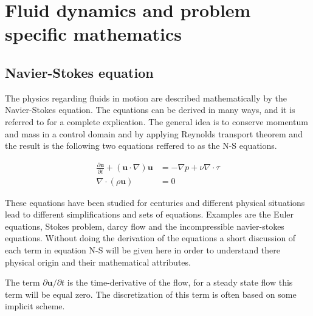 
\chapter{Fluid dynamics and problem specific mathematics} %

\label{physics} %


\section{Navier-Stokes equation}

The physics regarding fluids in motion are described mathematically by the Navier-Stokes equation. The equations can be derived in many ways, 
and it is referred to \cite{White} for a complete explication. The general idea is to conserve momentum and mass in a control domain and by 
applying Reynolds transport theorem and the result is the following two equations reffered to as the N-S equations. 

\begin{align}
	\frac{\partial \mathbf{u}}{\partial t} + (\mathbf{u}\cdot \nabla)\mathbf{u} &= -\nabla p + \nu \nabla \cdot \tau \\
		\nabla \cdot (\rho \mathbf{u}) &= 0
	\label{eq:NS}
\end{align}

These equations have been studied for centuries and different physical situations lead to different simplifications and sets of equations. 
Examples are the Euler equations, Stokes problem, darcy flow and the incompressible navier-stokes equations. 
Without doing the derivation of the equations a short discussion of each term in equation N-S will be given here in order to understand there
physical origin and their mathematical attributes. 

The term $\partial \mathbf{u} /\partial t$  is the time-derivative of the flow, for a steady state flow this term will be equal zero.
The discretization of this term is often based on some implicit scheme.  

